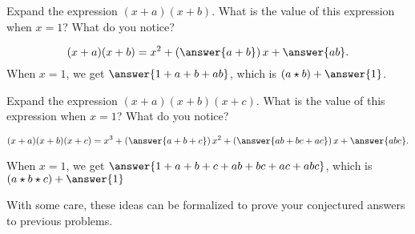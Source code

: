 \documentclass{ximera}
\begin{document}
\newpage 

\begin{problem}
Expand the expression $(x+a)(x+b)$.  What is the value of this expression when $x=1$?  What do you notice?

\begin{prompt}
\[
(x+a)(x+b) = x^2+ \left(\answer{a+b}\right)x+\answer{ab}.  
\]
When $x=1$, we get $\answer{1+a+b+ab}$, which is $(a\star b)+\answer{1}$.  
\end{prompt}

\end{problem}

\begin{problem}
Expand the expression $(x+a)(x+b)(x+c)$.  What is the value of this expression when $x=1$?  What do you notice?

\begin{prompt}
\[
(x+a)(x+b)(x+c) = x^3+ \left(\answer{a+b+c}\right)x^2+\left(\answer{ab+bc+ac}\right)x+\answer{abc}.  
\]

When $x=1$, we get $\answer{1+a+b+c+ab+bc+ac+abc}$, which is $(a\star b\star c)+\answer{1}$
\end{prompt}
With some care, these ideas can be formalized to prove your conjectured answers to previous problems.  
\end{problem}
\end{document}
